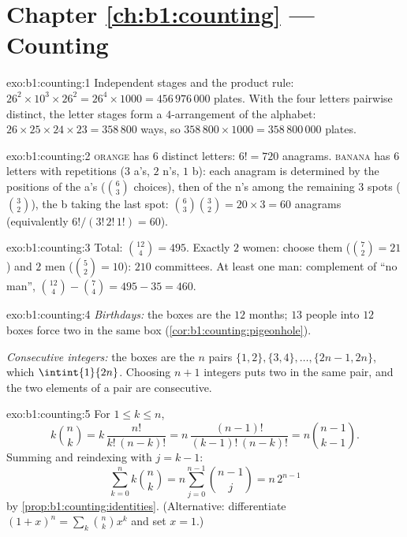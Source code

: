 \section*{Chapter \ref{ch:b1:counting} --- Counting}

\begin{solution}{exo:b1:counting:1}
Independent stages and the product rule: $26^2 \times 10^3 \times 26^2
= 26^4 \times 1000 = 456\,976\,000$ plates. With the four letters
pairwise distinct, the letter stages form a $4$-arrangement of the
alphabet: $26 \times 25 \times 24 \times 23 = 358\,800$ ways, so
$358\,800 \times 1000 = 358\,800\,000$ plates.
\end{solution}

\begin{solution}{exo:b1:counting:2}
\textsc{orange} has $6$ distinct letters: $6! = 720$ anagrams.
\textsc{banana} has $6$ letters with repetitions ($3$ a's, $2$ n's,
$1$ b): each anagram is determined by the positions of the a's
($\binom 63$ choices), then of the n's among the remaining $3$ spots
($\binom 32$), the b taking the last spot:
$\binom{6}{3}\binom{3}{2} = 20 \times 3 = 60$ anagrams
(equivalently $6!/(3!\,2!\,1!) = 60$).
\end{solution}

\begin{solution}{exo:b1:counting:3}
Total: $\binom{12}{4} = 495$. Exactly $2$ women: choose them
($\binom 72 = 21$) and $2$ men ($\binom 52 = 10$): $210$ committees.
At least one man: complement of ``no man'',
$\binom{12}{4} - \binom{7}{4} = 495 - 35 = 460$.
\end{solution}

\begin{solution}{exo:b1:counting:4}
\emph{Birthdays:} the boxes are the $12$ months; $13$ people into $12$
boxes force two in the same box
(\cref{cor:b1:counting:pigeonhole}).

\emph{Consecutive integers:} the boxes are the $n$ pairs $\{1,2\},
\{3,4\}, \dots, \{2n-1, 2n\}$, which  $\intint{1}{2n}$.
Choosing $n + 1$ integers puts two in the same pair, and the two
elements of a pair are consecutive.
\end{solution}

\begin{solution}{exo:b1:counting:5}
For $1 \leq k \leq n$,
\[
k \binom nk = k\,\frac{n!}{k!\,(n-k)!}
= n\,\frac{(n-1)!}{(k-1)!\,(n-k)!} = n \binom{n-1}{k-1}.
\]
Summing and reindexing with $j = k - 1$:
\[
\sum_{k=0}^{n} k \binom nk = n \sum_{j=0}^{n-1} \binom{n-1}{j}
= n\, 2^{n-1}
\]
by \cref{prop:b1:counting:identities}. (Alternative: differentiate
$(1+x)^n = \sum_k \binom nk x^k$ and set $x = 1$.)
\end{solution}

